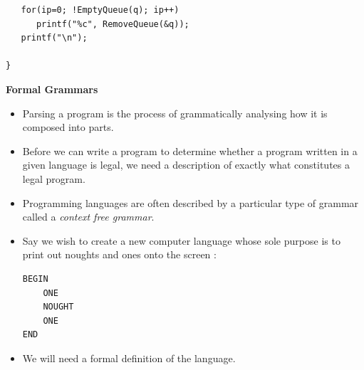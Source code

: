 \documentclass[a4,portraitt]{slides}
\begin{document}
{{{\begin{verbatim}
   for(ip=0; !EmptyQueue(q); ip++)
      printf("%c", RemoveQueue(&q));
   printf("\n");

}
\end{verbatim}
}}

\newpage
{\samepage
\begin{center}
{\Large{\bf Formal Grammars}}
\end{center}
\begin{itemize}
\item Parsing a program is the process of grammatically analysing how it is
 composed into parts.
\item Before we can write a program to determine whether a program written in a given language is legal, we need a description of exactly what constitutes a legal program.
\item Programming languages are often described by a particular type of grammar called a {\it context free grammar}.
\item Say we wish to create a new computer language whose sole purpose is to print out noughts and ones onto the screen :
\begin{verbatim}
BEGIN
    ONE
    NOUGHT
    ONE
END
\end{verbatim}
\item We will need a formal definition of the language.
\end{itemize}
}

}
\end{document}
